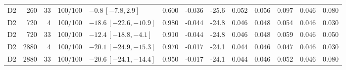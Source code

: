 \begin{longtable}{crrcp{33mm}rrrrrrrr}
D2 & 260 & 33 & 100/100 & \(-0.8\,[-7.8,2.9]\) & 0.600 & -0.036 & -25.6 & 0.052 & 0.056 & 0.097 & 0.046 & 0.080\\
D2 & 720 & 4 & 100/100 & \(-18.6\,[-22.6,-10.9]\) & 0.980 & -0.044 & -24.8 & 0.046 & 0.048 & 0.054 & 0.046 & 0.030\\
D2 & 720 & 33 & 100/100 & \(-12.4\,[-18.8,-4.1]\) & 0.910 & -0.044 & -24.8 & 0.046 & 0.048 & 0.059 & 0.046 & 0.050\\
D2 & 2880 & 4 & 100/100 & \(-20.1\,[-24.9,-15.3]\) & 0.970 & -0.017 & -24.1 & 0.044 & 0.046 & 0.047 & 0.046 & 0.030\\
D2 & 2880 & 33 & 100/100 & \(-20.6\,[-24.1,-14.4]\) & 0.950 & -0.017 & -24.1 & 0.044 & 0.046 & 0.052 & 0.046 & 0.080\\
\end{longtable}
